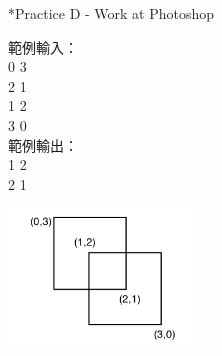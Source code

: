 \documentclass[t]{beamer}
\begin{document}
\begin{frame}{*Practice D - Work at Photoshop}
  \begin{center}
    \begin{minipage}[t]{.20\textwidth}
      範例輸入：\\
      0 3\\
      2 1\\
      1 2\\
      3 0\\
      範例輸出：\\
      1 2\\
      2 1
    \end{minipage}
    \begin{minipage}[t]{.40\textwidth}
      \begin{center}
        \includegraphics[height=10em]{image/pd.png}
      \end{center}
    \end{minipage}
  \end{center}
\end{frame}
\end{document}
